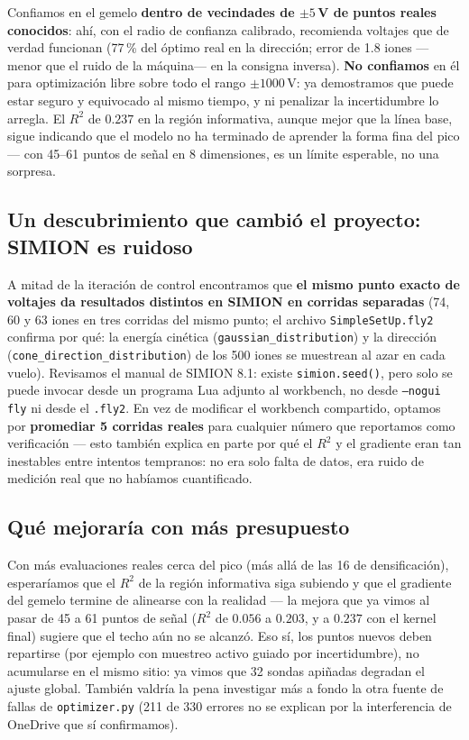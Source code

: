 \documentclass[11pt]{article}
\begin{document}
Confiamos en el gemelo \textbf{dentro de vecindades de $\pm5\,$V de puntos reales
conocidos}: ahí, con el radio de confianza calibrado, recomienda voltajes que de verdad
funcionan (77\,\% del óptimo real en la dirección; error de 1.8 iones —menor que el
ruido de la máquina— en la consigna inversa). \textbf{No confiamos}
en él para optimización libre sobre todo el rango $\pm1000\,$V: ya demostramos que puede
estar seguro y equivocado al mismo tiempo, y ni penalizar la incertidumbre lo arregla. El
$R^2$ de $0.237$ en la región informativa, aunque mejor que la línea base, sigue
indicando que el modelo no ha terminado de aprender la forma fina del pico — con 45--61
puntos de señal en 8 dimensiones, es un límite esperable, no una sorpresa.

\subsection{Un descubrimiento que cambió el proyecto: SIMION es ruidoso}

A mitad de la iteración de control encontramos que \textbf{el mismo punto exacto de
voltajes da resultados distintos en SIMION en corridas separadas} (74, 60 y 63 iones en
tres corridas del mismo punto; el archivo \texttt{SimpleSetUp.fly2} confirma por qué:
la energía cinética (\texttt{gaussian\_distribution}) y la dirección
(\texttt{cone\_direction\_distribution}) de los 500 iones se muestrean al azar en cada
vuelo). Revisamos el manual de SIMION 8.1: existe \texttt{simion.seed()}, pero solo se
puede invocar desde un programa Lua adjunto al workbench, no desde \texttt{--nogui fly}
ni desde el \texttt{.fly2}. En vez de modificar el workbench compartido, optamos por
\textbf{promediar 5 corridas reales} para cualquier número que reportamos como
verificación — esto también explica en parte por qué el $R^2$ y el gradiente eran tan
inestables entre intentos tempranos: no era solo falta de datos, era ruido de medición
real que no habíamos cuantificado.

\subsection{Qué mejoraría con más presupuesto}

Con más evaluaciones reales cerca del pico (más allá de las 16 de densificación),
esperaríamos que el $R^2$ de la región informativa siga subiendo y que el gradiente del
gemelo termine de alinearse con la realidad — la mejora que ya vimos al pasar de 45 a 61
puntos de señal ($R^2$ de $0.056$ a $0.203$, y a $0.237$ con el kernel final) sugiere que
el techo aún no se alcanzó. Eso sí, los puntos nuevos deben repartirse (por ejemplo con
muestreo activo guiado por incertidumbre), no acumularse en el mismo sitio: ya vimos que
32 sondas apiñadas degradan el ajuste global. También
valdría la pena investigar más a fondo la otra fuente de fallas de \texttt{optimizer.py}
(211 de 330 errores no se explican por la interferencia de OneDrive que sí confirmamos).
\end{document}
